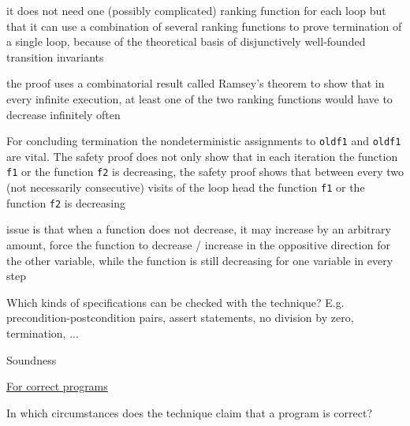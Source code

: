 \documentclass[a4paper]{article}
\begin{document}
\begin{minipage}[t]{0.16\linewidth}
\begin{betterlist}
{{\begin{betterlist}
					\codeone
					\codetwo
					\item it does not need one (possibly complicated) ranking function for each loop but that it can use a combination of several ranking functions to prove termination of a single loop, because of the theoretical basis of disjunctively well-founded transition invariants
					\begin{betterlist}
						\item the proof uses a combinatorial result called Ramsey’s theorem to show that in every infinite execution, at least one of the two ranking functions would have to decrease infinitely often
					\end{betterlist}
					\item For concluding termination the nondeterministic assignments to \texttt{oldf1} and \texttt{oldf1} are vital. The safety proof does not only show that in each iteration the function \texttt{f1} or the function \texttt{f2} is decreasing, the safety proof shows that between every two (not necessarily consecutive) visits of the loop head the function \texttt{f1} or the function \texttt{f2} is decreasing
					\begin{betterlist}
						\item issue is that when a function does not decrease, it may increase by an arbitrary amount, force the function to decrease / increase in the oppositive direction for the other variable, while the function is still decreasing for one variable in every step
					\end{betterlist}

					\codefour
				\end{betterlist}
			}}
		\item Which kinds of specifications can be checked with the technique? E.g. precondition-postcondition pairs, assert statements, no division by zero, termination, ...

		\item \alert{Soundness}
		\begin{betterlist}
			\item \underline{For correct programs}
			\begin{betterlist}
				\item In which circumstances does the technique claim that a program is correct?


\end{betterlist}
\end{betterlist}
\end{betterlist}
\end{minipage}
\end{document}
